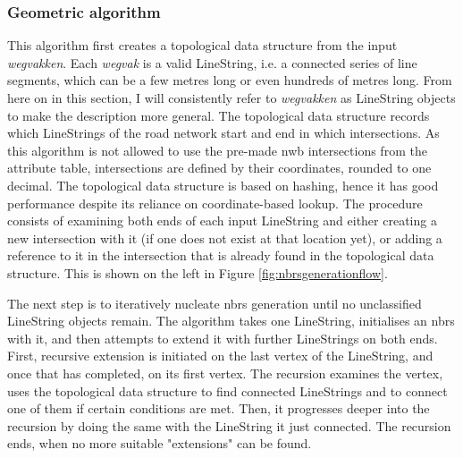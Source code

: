 \subsubsection{Geometric algorithm}

This algorithm first creates a topological data structure from the input \textit{wegvakken}. Each \textit{wegvak} is a valid LineString, i.e. a connected series of line segments, which can be a few metres long or even hundreds of metres long. From here on in this section, I will consistently refer to \textit{wegvakken} as LineString objects to make the description more general. The topological data structure records which LineStrings of the road network start and end in which intersections. As this algorithm is not allowed to use the pre-made \ac{nwb} intersections from the attribute table, intersections are defined by their coordinates, rounded to one decimal. The topological data structure is based on hashing, hence it has good performance despite its reliance on coordinate-based lookup. The procedure consists of examining both ends of each input LineString and either creating a new intersection with it (if one does not exist at that location yet), or adding a reference to it in the intersection that is already found in the topological data structure. This is shown on the left in Figure \ref{fig:nbrsgenerationflow}.

The next step is to iteratively nucleate \ac{nbrs} generation until no unclassified LineString objects remain. The algorithm takes one LineString, initialises an \ac{nbrs} with it, and then attempts to extend it with further LineStrings on both ends. First, recursive extension is initiated on the last vertex of the LineString, and once that has completed, on its first vertex. The recursion examines the vertex, uses the topological data structure to find connected LineStrings and to connect one of them if certain conditions are met. Then, it progresses deeper into the recursion by doing the same with the LineString it just connected. The recursion ends, when no more suitable "extensions" can be found.

